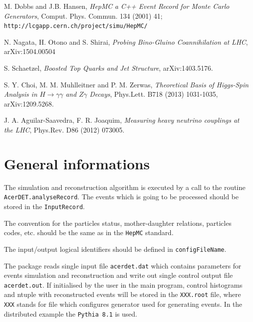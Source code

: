 \begin{thebibliography}{}
 M. Dobbs and J.B. Hansen, {\it  HepMC a C++ Event Record for Monte Carlo Generators},
Comput. Phys. Commun. 134 (2001) 41;\\ {\tt http://lcgapp.cern.ch/project/simu/HepMC/}

N. Nagata, H. Otono and S. Shirai, {\it Probing Bino-Gluino Coannihilation at LHC},
arXiv:1504.00504

S. Schaetzel, {\it Boosted Top Quarks and Jet Structure}, arXiv:1403.5176.

S. Y. Choi, M. M. Muhlleitner and P. M. Zerwas, 
{\it Theoretical Basis of Higgs-Spin Analysis in $H \rightarrow \gamma \gamma$ and $Z\gamma$ Decays},
Phys.Lett. B718 (2013) 1031-1035, arXiv:1209.5268. 

J. A. Aguilar-Saavedra, F. R. Joaquim, {\it Measuring heavy neutrino couplings at the LHC},
Phys.Rev. D86 (2012) 073005.


\end{thebibliography}

\newpage
\appendix


\section{General informations}

The simulation and reconstruction algorithm is executed by a call to the
routine\\ {\tt AcerDET.analyseRecord}. 
The events which is going to be processed should be stored
in the {\tt InputRecord}.

The convention for the particles status, mother-daughter relations,
particles codes, etc. should be the same as in the {\tt HepMC} standard.

The input/output logical identifiers should be defined in {\tt configFileName}.

The package reads single input file {\tt acerdet.dat} which contains
parameters for events simulation and reconstruction and write out
single control output file  {\tt acerdet.out}. If initialised by the
user in the main program, control histograms and ntuple with
reconstructed events will be stored in the  {\tt XXX.root} file,
where {\tt XXX} stands for file which configures generator used 
for generating events. In the distributed example the {\tt Pythia 8.1} is used. 

